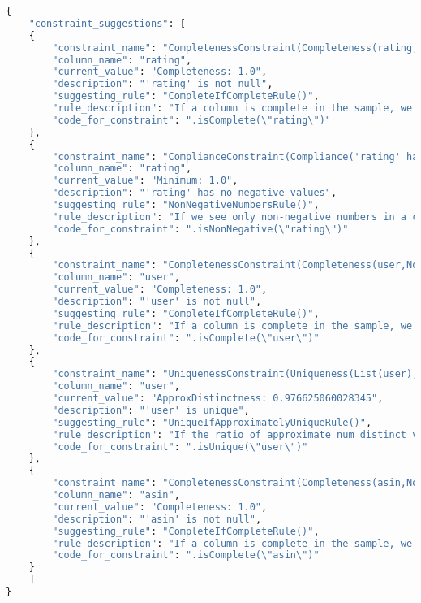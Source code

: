 \begin{code}
    \caption{Ausgabe aller Empfehlungen für Überprüfungsregeln der Videospieldaten}
    
\begin{lstlisting}[language=Python]
{
    "constraint_suggestions": [
    {
        "constraint_name": "CompletenessConstraint(Completeness(rating,None))",
        "column_name": "rating",
        "current_value": "Completeness: 1.0",
        "description": "'rating' is not null",
        "suggesting_rule": "CompleteIfCompleteRule()",
        "rule_description": "If a column is complete in the sample, we suggest a NOT NULL constraint",
        "code_for_constraint": ".isComplete(\"rating\")"
    },
    {
        "constraint_name": "ComplianceConstraint(Compliance('rating' has no negative values,rating >= 0,None))",
        "column_name": "rating",
        "current_value": "Minimum: 1.0",
        "description": "'rating' has no negative values",
        "suggesting_rule": "NonNegativeNumbersRule()",
        "rule_description": "If we see only non-negative numbers in a column, we suggest a corresponding constraint",
        "code_for_constraint": ".isNonNegative(\"rating\")"
    },
    {
        "constraint_name": "CompletenessConstraint(Completeness(user,None))",
        "column_name": "user",
        "current_value": "Completeness: 1.0",
        "description": "'user' is not null",
        "suggesting_rule": "CompleteIfCompleteRule()",
        "rule_description": "If a column is complete in the sample, we suggest a NOT NULL constraint",
        "code_for_constraint": ".isComplete(\"user\")"
    },
    {
        "constraint_name": "UniquenessConstraint(Uniqueness(List(user),None))",
        "column_name": "user",
        "current_value": "ApproxDistinctness: 0.976625060028345",
        "description": "'user' is unique",
        "suggesting_rule": "UniqueIfApproximatelyUniqueRule()",
        "rule_description": "If the ratio of approximate num distinct values in a column is close to the number of records (within the error of the HLL sketch), we suggest a UNIQUE constraint",
        "code_for_constraint": ".isUnique(\"user\")"
    },
    {
        "constraint_name": "CompletenessConstraint(Completeness(asin,None))",
        "column_name": "asin",
        "current_value": "Completeness: 1.0",
        "description": "'asin' is not null",
        "suggesting_rule": "CompleteIfCompleteRule()",
        "rule_description": "If a column is complete in the sample, we suggest a NOT NULL constraint",
        "code_for_constraint": ".isComplete(\"asin\")"
    }
    ]
}
\end{lstlisting}
\end{code}

